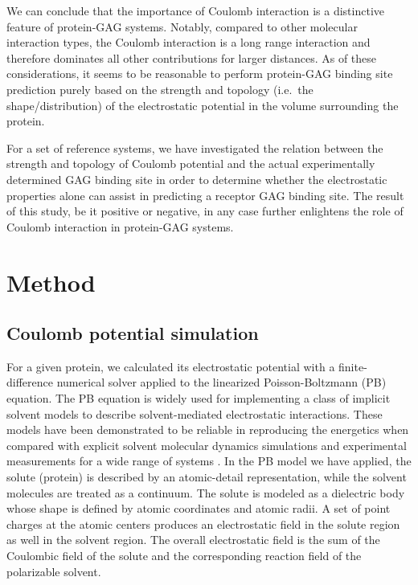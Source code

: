 We can conclude that the importance of Coulomb interaction is a distinctive
feature of protein-GAG systems. Notably, compared to other molecular interaction
types, the Coulomb interaction is a long range interaction and therefore
dominates all other contributions for larger distances. As of these
considerations, it seems to be reasonable to perform protein-GAG binding site
prediction purely based on the strength and topology (i.e.\ the
shape/distribution) of the electrostatic potential in the volume surrounding the
protein.

For a set of reference systems, we have investigated the relation between the
strength and topology of Coulomb potential and the actual experimentally
determined GAG binding site in order to determine whether the electrostatic
properties alone can assist in predicting a receptor GAG binding site. The
result of this study, be it positive or negative, in any case further enlightens
the role of Coulomb interaction in protein-GAG systems.


\section{Method}

\subsection{Coulomb potential simulation}

For a given protein, we calculated its electrostatic potential with a
finite-difference numerical solver applied to the linearized Poisson-Boltzmann
(PB) equation. The PB equation is widely used for implementing a class of
implicit solvent models to describe solvent-mediated electrostatic interactions.
These models have been demonstrated to be reliable in reproducing the energetics
when compared with explicit solvent molecular dynamics simulations and
experimental measurements for a wide range of systems \cite{honig_estatic_1995}.
In the PB model we have applied, the solute (protein) is described by an
atomic-detail representation, while the solvent molecules are treated as a
continuum. The solute is modeled as a dielectric body whose shape is defined by
atomic coordinates and atomic radii. A set of point charges at the atomic
centers produces an electrostatic field in the solute region as well in the
solvent region. The overall electrostatic field is the sum of the Coulombic
field of the solute and the corresponding reaction field of the polarizable
solvent.

